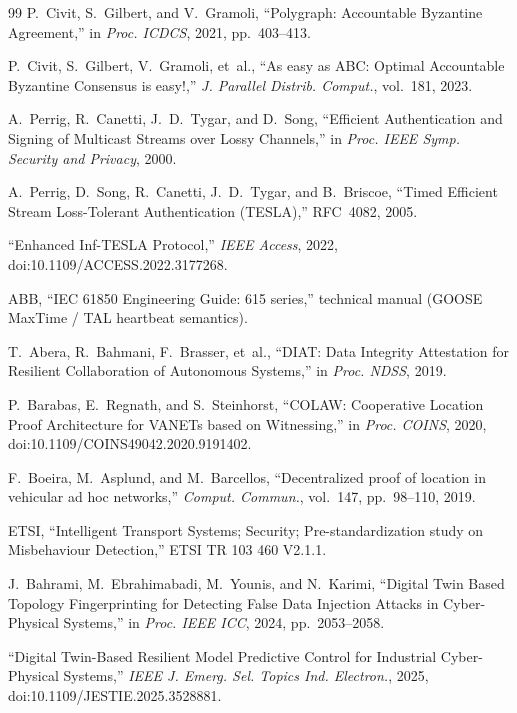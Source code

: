 \documentclass[manuscript,screen,review]{acmart}
\begin{document}
\begin{thebibliography}{99}
P.~Civit, S.~Gilbert, and V.~Gramoli,
``Polygraph: Accountable Byzantine Agreement,''
in \textit{Proc. ICDCS}, 2021, pp.~403--413.

P.~Civit, S.~Gilbert, V.~Gramoli, et~al.,
``As easy as ABC: Optimal Accountable Byzantine Consensus is easy!,''
\textit{J. Parallel Distrib. Comput.}, vol.~181, 2023.

A.~Perrig, R.~Canetti, J.~D.~Tygar, and D.~Song,
``Efficient Authentication and Signing of Multicast Streams over Lossy Channels,''
in \textit{Proc. IEEE Symp. Security and Privacy}, 2000.

A.~Perrig, D.~Song, R.~Canetti, J.~D.~Tygar, and B.~Briscoe,
``Timed Efficient Stream Loss-Tolerant Authentication (TESLA),''
RFC~4082, 2005.

``Enhanced Inf-TESLA Protocol,''
\textit{IEEE Access}, 2022, doi:10.1109/ACCESS.2022.3177268.

ABB,
``IEC 61850 Engineering Guide: 615 series,''
technical manual (GOOSE MaxTime / TAL heartbeat semantics).

T.~Abera, R.~Bahmani, F.~Brasser, et~al.,
``DIAT: Data Integrity Attestation for Resilient Collaboration of Autonomous Systems,''
in \textit{Proc. NDSS}, 2019.

P.~Barabas, E.~Regnath, and S.~Steinhorst,
``COLAW: Cooperative Location Proof Architecture for VANETs based on Witnessing,''
in \textit{Proc. COINS}, 2020, doi:10.1109/COINS49042.2020.9191402.

F.~Boeira, M.~Asplund, and M.~Barcellos,
``Decentralized proof of location in vehicular ad hoc networks,''
\textit{Comput. Commun.}, vol.~147, pp.~98--110, 2019.

ETSI,
``Intelligent Transport Systems; Security; Pre-standardization study on Misbehaviour Detection,''
ETSI TR 103 460 V2.1.1.

J.~Bahrami, M.~Ebrahimabadi, M.~Younis, and N.~Karimi,
``Digital Twin Based Topology Fingerprinting for Detecting False Data Injection Attacks in Cyber-Physical Systems,''
in \textit{Proc. IEEE ICC}, 2024, pp.~2053--2058.

``Digital Twin-Based Resilient Model Predictive Control for Industrial Cyber-Physical Systems,''
\textit{IEEE J. Emerg. Sel. Topics Ind. Electron.}, 2025, doi:10.1109/JESTIE.2025.3528881.


\end{thebibliography}
\end{document}
